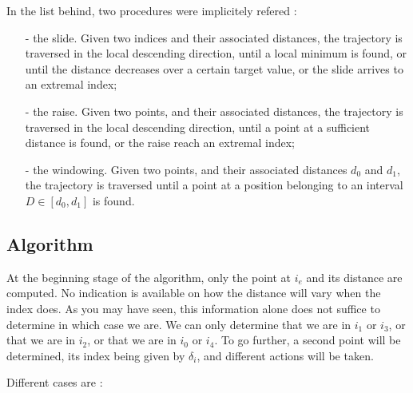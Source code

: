 In the list behind, two procedures were implicitely refered : 
\begin{itemize}

\item[-] the slide. Given two indices and their associated distances, the trajectory is traversed in the 
local descending direction, until a local minimum is found, or until the distance decreases 
over a certain target value, or the slide arrives to an extremal index;

\item[-] the raise. Given two points, and their associated distances, the trajectory is traversed in the
local descending direction, until a point at a sufficient distance is found, or the raise reach an extremal 
index;

\item[-] the windowing. Given two points, and their associated distances $d_0$ and $d_1$, 
the trajectory is traversed until a point at a position belonging to an interval 
$D \in [d_0, d_1]$ is found.

\end{itemize}


\subsection{Algorithm}












At the beginning stage of the algorithm, only the point at $i_e$ and its distance are computed.
No indication is available on how the distance will vary when the index does. 
As you may have seen, this information alone does not suffice to determine in which case 
we are.
We can only determine that we are in $i_1$ or $i_3$, or that we are in $i_2$, or that we are 
in $i_0$ or $i_4$.
To go further, a second point will be determined, its index being given by $\delta _i$, and different actions
will be taken.
\newline

Different cases are : 

